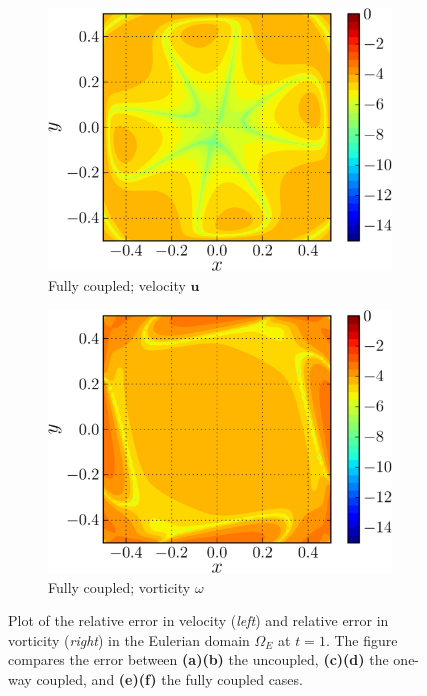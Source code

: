\begin{figure}[!b]
     \begin{subfigure}[t]{0.45\textwidth}
             \includegraphics[width=\linewidth]{./figures/validation/lambOseent2/lambOseen_fully_vErrorFinal_compressed-crop.png}
             \caption{Fully coupled; velocity $\mathbf{u}$}
             \label{fig:lambOseen_fully_vErrorFinal}
     \end{subfigure}     
     \qquad
     \begin{subfigure}[t]{0.45\textwidth}
             \includegraphics[width=\linewidth]{./figures/validation/lambOseent2/lambOseen_fully_wErrorFinal_compressed-crop.png}
             \caption{Fully coupled; vorticity $\omega$}
             \label{fig:lambOseen_fully_wErrorFinal}
     \end{subfigure}        
     
     \caption{Plot of the relative error in velocity (\textit{left}) and relative error in vorticity (\textit{right}) in the Eulerian domain $\Omega_E$ at $t=1$. The figure compares the error between \textbf{(a)}\textbf{(b)} the uncoupled, \textbf{(c)}\textbf{(d)} the one-way coupled, and \textbf{(e)}\textbf{(f)} the fully coupled cases.}
     \label{fig:lambOseen_finalError}
	\end{figure}

